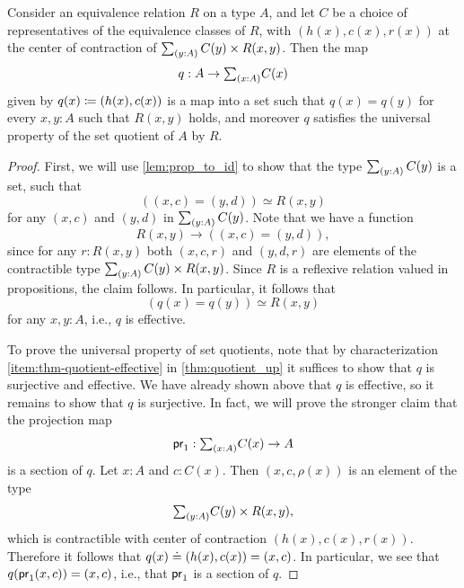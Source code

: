 \begin{thm}\label{thm:choice-of-representatives}
  Consider an equivalence relation $R$ on a type $A$, and let $C$ be a choice of representatives of the equivalence classes of $R$, with $(h(x),c(x),r(x))$ at the center of contraction of $\sm{y:A}C(y)\times R(x,y)$. Then the map
  \begin{equation*}
    q:A\to\sm{x:A}C(x)
  \end{equation*}
  given by $q(x)\coloneqq(h(x),c(x))$ is a map into a set such that $q(x)=q(y)$ for every $x,y:A$ such that $R(x,y)$ holds, and moreover $q$ satisfies the universal property of the set quotient of $A$ by $R$. 
\end{thm}

\begin{proof}
  First, we will use \cref{lem:prop_to_id} to show that the type $\sm{y:A}C(y)$ is a set, such that
  \begin{equation*}
    ((x,c)=(y,d))\simeq R(x,y)
  \end{equation*}
  for any $(x,c)$ and $(y,d)$ in $\sm{y:A}C(y)$. Note that we have a function
  \begin{equation*}
    R(x,y)\to ((x,c)=(y,d)),
  \end{equation*}
  since for any $r:R(x,y)$ both $(x,c,r)$ and $(y,d,r)$ are elements of the contractible type ${\sm{y:A}C(y)\times R(x,y)}$. Since $R$ is a reflexive relation valued in propositions, the claim follows. In particular, it follows that
  \begin{equation*}
    (q(x)=q(y))\simeq R(x,y)
  \end{equation*}
  for any $x,y:A$, i.e., $q$ is effective.
  
  To prove the universal property of set quotients, note that by characterization \ref{item:thm-quotient-effective} in \cref{thm:quotient_up} it suffices to show that $q$ is surjective and effective. We have already shown above that $q$ is effective, so it remains to show that $q$ is surjective. In fact, we will prove the stronger claim that the projection map
  \begin{equation*}
    \proj 1:\sm{x:A}C(x)\to A  
  \end{equation*}
  is a section of $q$. Let $x:A$ and $c:C(x)$. Then $(x,c,\rho(x))$ is an element of the type
  \begin{equation*}
    \sm{y:A}C(y)\times R(x,y),
  \end{equation*}
  which is contractible with center of contraction $(h(x),c(x),r(x))$. Therefore it follows that $q(x)\doteq (h(x),c(x))=(x,c)$. In particular, we see that $q(\mathsf{pr}_{1}(x,c))=(x,c)$, i.e., that $\mathsf{pr}_{1}$ is a section of $q$.
\end{proof}

